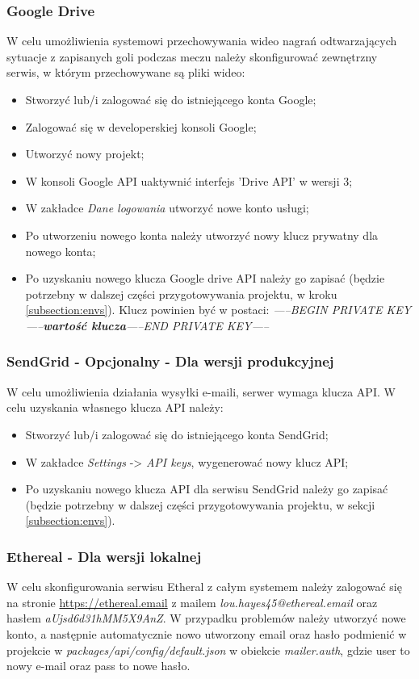 \subsubsection{Google Drive}
W celu umożliwienia systemowi przechowywania wideo nagrań odtwarzających sytuacje z zapisanych goli podczas meczu należy skonfigurować zewnętrzny serwis, w którym przechowywane są pliki wideo:

\begin{itemize}
	\item Stworzyć lub/i zalogować się do istniejącego konta Google;
	\item Zalogować się w developerskiej konsoli Google;
	\item Utworzyć nowy projekt;
	\item W konsoli Google API uaktywnić interfejs 'Drive API' w wersji 3;
	\item W zakładce \textit{Dane logowania} utworzyć nowe konto usługi;
	\item Po utworzeniu nowego konta należy utworzyć nowy klucz prywatny dla nowego konta;
  \item Po uzyskaniu nowego klucza Google drive API należy go zapisać  (będzie potrzebny w dalszej części przygotowywania projektu, w kroku \ref{subsection:envs}). Klucz powinien być w postaci: \newline \textit{-----BEGIN PRIVATE KEY-----\textbf{wartość klucza}-----END PRIVATE KEY-----}
\end{itemize}


\subsubsection{SendGrid - Opcjonalny - Dla wersji produkcyjnej}
W celu umożliwienia działania wysyłki e-maili, serwer wymaga klucza API. W celu uzyskania własnego klucza API należy:

\begin{itemize}
	\item Stworzyć lub/i zalogować się do istniejącego konta SendGrid;
	\item W zakładce \textit{Settings} -> \textit{API keys}, wygenerować nowy klucz API;
	\item Po uzyskaniu nowego klucza API dla serwisu SendGrid należy go zapisać (będzie potrzebny w dalszej części przygotowywania projektu, w sekcji \ref{subsection:envs}).
\end{itemize}

\label{application:preparation:etheral}
\subsubsection{Ethereal - Dla wersji lokalnej}
W celu skonfigurowania serwisu Etheral z całym systemem należy zalogować się na stronie \url{https://ethereal.email} z mailem
\textit{lou.hayes45@ethereal.email} oraz hasłem \textit{aUjsd6d31hMM5X9AnZ}. W przypadku problemów należy utworzyć nowe konto, a następnie automatycznie nowo utworzony email oraz hasło podmienić w projekcie w \textit{packages/api/config/default.json} w obiekcie \textit{mailer.auth}, gdzie user to nowy e-mail oraz pass to nowe hasło.

